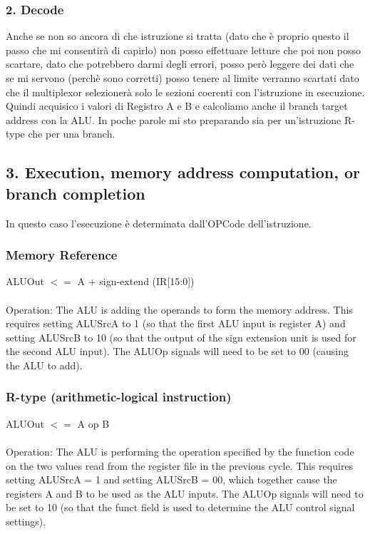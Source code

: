 \documentclass[12pt, a4paper, openany]{book}
\begin{document}
\subsubsection*{2. Decode}
Anche se non so ancora di che istruzione si tratta (dato che è proprio questo il passo che mi
consentirà di capirlo) non posso effettuare letture che poi non posso scartare, dato che
potrebbero darmi degli errori, posso però leggere dei dati che se mi servono (perchè sono corretti) posso tenere
al limite verranno scartati dato che il multiplexor selezionerà solo le sezioni coerenti con l'istruzione in esecuzione.
Quindi acquisico i valori di Registro A e B e calcoliamo anche il branch target address con la ALU.
In poche parole mi sto preparando sia per un'istruzione R-type che per una branch.

\subsection{3. Execution, memory address computation, or branch completion}
In questo caso l'esecuzione è determinata dall'OPCode dell'istruzione.
\subsubsection*{Memory Reference}
ALUOut $<=$ A + sign-extend (IR[15:0])
\\
\\ Operation: The ALU is adding the operands to form the memory address. This
requires setting ALUSrcA to 1 (so that the first ALU input is register A) and setting
ALUSrcB to 10 (so that the output of the sign extension unit is used for the second
ALU input). The ALUOp signals will need to be set to 00 (causing the ALU to add).

\subsubsection*{R-type (arithmetic-logical instruction)}
ALUOut $<=$ A op B
\\
\\ Operation: The ALU is performing the operation specified by the function code
on the two values read from the register file in the previous cycle. This requires
setting ALUSrcA = 1 and setting ALUSrcB = 00, which together cause the registers
A and B to be used as the ALU inputs. The ALUOp signals will need to be set to 10
(so that the funct field is used to determine the ALU control signal settings).
\end{document}
